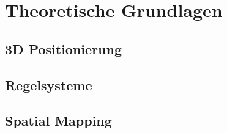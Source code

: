 \chapter{Theoretische Grundlagen}

\section{3D Positionierung}

\section{Regelsysteme}

\section{Spatial Mapping}
